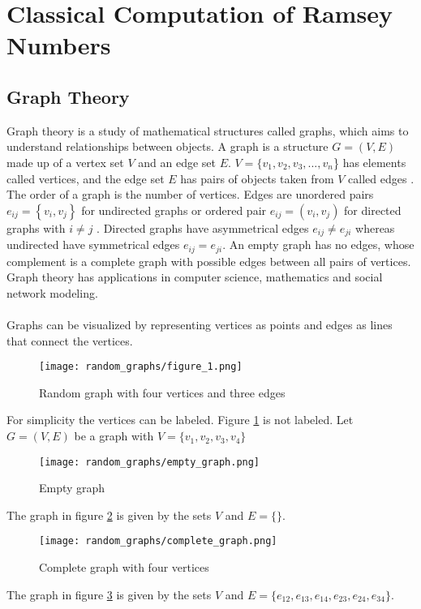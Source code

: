 \documentclass{Assignment}
\begin{document}
\section{Classical Computation of Ramsey Numbers}
\subsection{Graph Theory}
Graph theory is a study of mathematical structures called graphs, which aims to understand relationships between objects. 
A graph is a structure $G =\left(V,E\right)$ made up of a vertex set $V$ and an edge set $E$.
$V = \{v_1,v_2,v_3,...,v_n$\} has elements called vertices, and the edge set $E$ has pairs of objects taken from $V$ called edges \cite{BondyMurty2008}.
The order of a graph is the number of vertices.
Edges are unordered pairs $e_{ij} = \left\{v_i,v_j\right\}$ for undirected graphs or ordered pair $e_{ij} = (v_i,v_j)$ for directed graphs with $i\neq j$  \cite{BondyMurty2008}.
Directed graphs have asymmetrical edges $e_{ij} \neq e_{ji}$ whereas undirected have symmetrical edges $e_{ij} = e_{ji}$.
An empty graph has no edges, whose complement is a complete graph with possible edges between all pairs of vertices.
Graph theory has applications in computer science, mathematics and social network modeling.
\\\\
Graphs can be visualized by representing vertices as points and edges as lines that connect the vertices.
\begin{figure}[H]
	\centering
	\texttt{[image: random\_graphs/figure\_1.png]}
	\caption{Random graph with four vertices and three edges}
	\label{random_graph}
\end{figure}
For simplicity the vertices can be labeled.
Figure \ref{random_graph} is not labeled.
Let $G = (V,E)$ be a graph with $V = \{v_1, v_2, v_3, v_4\}$
\begin{figure}[H]
	\centering
	\texttt{[image: random\_graphs/empty\_graph.png]}
	\caption{Empty graph}
	\label{empty_graph}
\end{figure}
The graph in figure \ref{empty_graph} is given by the sets $V$ and $E=\{\}.$
\begin{figure}[H]
	\centering
	\texttt{[image: random\_graphs/complete\_graph.png]}
	\caption{Complete graph with four vertices }
	\label{complete_graph}
\end{figure}
The graph in figure \ref{complete_graph} is given by the sets  $V $ and $E=\{e_{12},e_{13},e_{14},e_{23},e_{24},e_{34}\}.$ 
\end{document}
